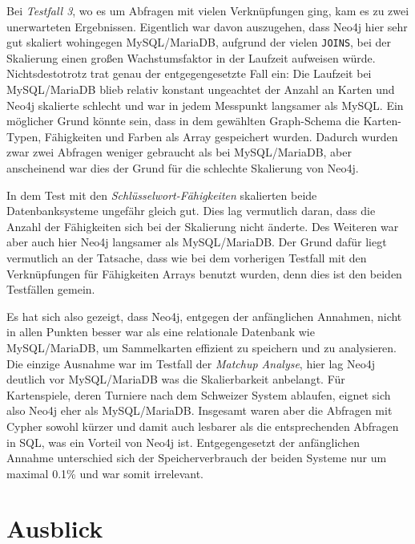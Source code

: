 Bei \emph{Testfall 3}, wo es um Abfragen mit vielen Verknüpfungen ging, kam es zu zwei unerwarteten Ergebnissen. Eigentlich war davon auszugehen, dass Neo4j hier sehr gut skaliert wohingegen MySQL/MariaDB, aufgrund der vielen \verb|JOINS|, bei der Skalierung einen großen Wachstumsfaktor in der Laufzeit aufweisen würde. Nichtsdestotrotz trat genau der entgegengesetzte Fall ein: Die Laufzeit bei MySQL/MariaDB blieb relativ konstant ungeachtet der Anzahl an Karten und Neo4j skalierte schlecht und war in jedem Messpunkt langsamer als MySQL. Ein möglicher Grund könnte sein, dass in dem gewählten Graph-Schema die Karten-Typen, Fähigkeiten und Farben als Array gespeichert wurden. Dadurch wurden zwar zwei Abfragen weniger gebraucht als bei MySQL/MariaDB, aber anscheinend war dies der Grund für die schlechte Skalierung von Neo4j.

In dem Test mit den \emph{Schlüsselwort-Fähigkeiten} skalierten beide Datenbanksysteme ungefähr gleich gut. Dies lag vermutlich daran, dass die Anzahl der Fähigkeiten sich bei der Skalierung nicht änderte. Des Weiteren war aber auch hier Neo4j langsamer als MySQL/MariaDB. Der Grund dafür liegt vermutlich an der Tatsache, dass wie bei dem vorherigen Testfall mit den Verknüpfungen für Fähigkeiten Arrays benutzt wurden, denn dies ist den beiden Testfällen gemein.

Es hat sich also gezeigt, dass Neo4j, entgegen der anfänglichen Annahmen, nicht in allen Punkten besser war als eine relationale Datenbank wie MySQL/MariaDB, um Sammelkarten effizient zu speichern und zu analysieren. Die einzige Ausnahme war im Testfall der \emph{Matchup Analyse}, hier lag Neo4j deutlich vor MySQL/MariaDB was die Skalierbarkeit anbelangt. Für Kartenspiele, deren Turniere nach dem Schweizer System ablaufen, eignet sich also Neo4j eher als MySQL/MariaDB. Insgesamt waren aber die Abfragen mit Cypher sowohl kürzer und damit auch lesbarer als die entsprechenden Abfragen in SQL, was ein Vorteil von Neo4j ist. Entgegengesetzt der anfänglichen Annahme unterschied sich der Speicherverbrauch der beiden Systeme nur um maximal 0.1\% und war somit irrelevant.

\section{Ausblick}

